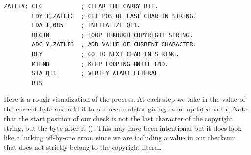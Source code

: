 \begin{lstlisting}
ZATLIV: CLC           ; CLEAR THE CARRY BIT.
        LDY I,ZATLIC  ; GET POS OF LAST CHAR IN STRING.
        LDA I,085     ; INITIALIZE QT1.
        BEGIN         ; LOOP THROUGH COPYRIGHT STRING.
        ADC Y,ZATLIS  ; ADD VALUE OF CURRENT CHARACTER.
        DEY           ; GO TO NEXT CHAR IN STRING.
        MIEND         ; KEEP LOOPING UNTIL END.
        STA QT1       ; VERIFY ATARI LITERAL
        RTS
\end{lstlisting}

Here is a rough visualization of the process. At each step we take in the value of the current
byte and add it to our accumulator giving us an updated value. Note that the start position of
our check is not the last character of the copyright string, but the byte after it (). This may
have been intentional but it does look like a lurking off-by-one error, since we are including
a value in our checksum that does not strictly belong to the copyright literal.

